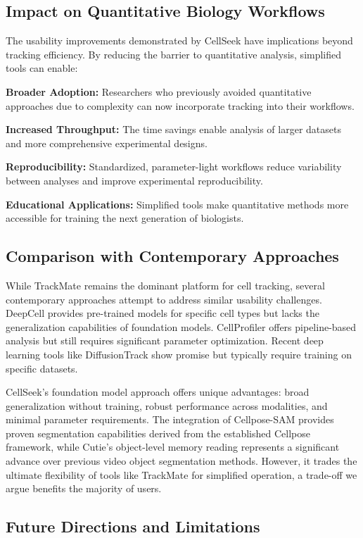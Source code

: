 \documentclass[12pt]{article}
\begin{document}
\subsection{Impact on Quantitative Biology Workflows}

The usability improvements demonstrated by CellSeek have implications beyond tracking efficiency. By reducing the barrier to quantitative analysis, simplified tools can enable:

\textbf{Broader Adoption:} Researchers who previously avoided quantitative approaches due to complexity can now incorporate tracking into their workflows.

\textbf{Increased Throughput:} The time savings enable analysis of larger datasets and more comprehensive experimental designs.

\textbf{Reproducibility:} Standardized, parameter-light workflows reduce variability between analyses and improve experimental reproducibility.

\textbf{Educational Applications:} Simplified tools make quantitative methods more accessible for training the next generation of biologists.

\subsection{Comparison with Contemporary Approaches}

While TrackMate remains the dominant platform for cell tracking, several contemporary approaches attempt to address similar usability challenges. DeepCell provides pre-trained models for specific cell types but lacks the generalization capabilities of foundation models. CellProfiler offers pipeline-based analysis but still requires significant parameter optimization. Recent deep learning tools like DiffusionTrack show promise but typically require training on specific datasets.

CellSeek's foundation model approach offers unique advantages: broad generalization without training, robust performance across modalities, and minimal parameter requirements. The integration of Cellpose-SAM provides proven segmentation capabilities derived from the established Cellpose framework, while Cutie's object-level memory reading represents a significant advance over previous video object segmentation methods. However, it trades the ultimate flexibility of tools like TrackMate for simplified operation, a trade-off we argue benefits the majority of users.

\subsection{Future Directions and Limitations}
\end{document}
